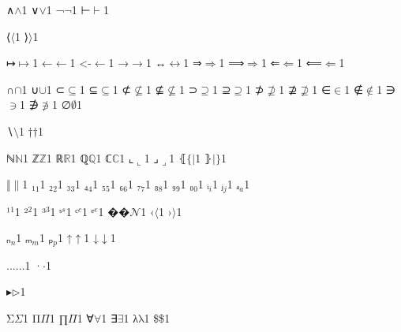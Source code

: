 {{∧}{{\ensuremath{\wedge}}}1
{∨}{{\ensuremath{\vee}}}1
{¬}{{\ensuremath{\neg}}}1
{⊢}{{\ensuremath{\vdash}}}1

{⟨}{{\ensuremath{\langle}}}1
{⟩}{{\ensuremath{\rangle}}}1

{↦}{{\ensuremath{\mapsto}}}1
{←}{{\ensuremath{\leftarrow}}}1
{<-}{{\ensuremath{\leftarrow}}}1
{→}{{\ensuremath{\rightarrow}}}1
{↔}{{\ensuremath{\leftrightarrow}}}1
{⇒}{{\ensuremath{\Rightarrow}}}1
{⟹}{{\ensuremath{\Longrightarrow}}}1
{⇐}{{\ensuremath{\Leftarrow}}}1
{⟸}{{\ensuremath{\Longleftarrow}}}1

{∩}{{\ensuremath{\cap}}}1
{∪}{{\ensuremath{\cup}}}1
{⊂}{{\ensuremath{\subseteq}}}1
{⊆}{{\ensuremath{\subseteq}}}1
{⊄}{{\ensuremath{\nsubseteq}}}1
{⊈}{{\ensuremath{\nsubseteq}}}1
{⊃}{{\ensuremath{\supseteq}}}1
{⊇}{{\ensuremath{\supseteq}}}1
{⊅}{{\ensuremath{\nsupseteq}}}1
{⊉}{{\ensuremath{\nsupseteq}}}1
{∈}{{\ensuremath{\in}}}1
{∉}{{\ensuremath{\notin}}}1
{∋}{{\ensuremath{\ni}}}1
{∌}{{\ensuremath{\notni}}}1
{∅}{{\ensuremath{\emptyset}}}1

{∖}{{\ensuremath{\setminus}}}1
{†}{{\ensuremath{\dag}}}1

{ℕ}{{\ensuremath{\mathbb{N}}}}1
{ℤ}{{\ensuremath{\mathbb{Z}}}}1
{ℝ}{{\ensuremath{\mathbb{R}}}}1
{ℚ}{{\ensuremath{\mathbb{Q}}}}1
{ℂ}{{\ensuremath{\mathbb{C}}}}1
{⌞}{{\ensuremath{\llcorner}}}1
{⌟}{{\ensuremath{\lrcorner}}}1
{⦃}{{\ensuremath{\{\!|}}}1
{⦄}{{\ensuremath{|\!\}}}}1

{‖}{{\ensuremath{\|}}}1
{₁}{{\ensuremath{_1}}}1
{₂}{{\ensuremath{_2}}}1
{₃}{{\ensuremath{_3}}}1
{₄}{{\ensuremath{_4}}}1
{₅}{{\ensuremath{_5}}}1
{₆}{{\ensuremath{_6}}}1
{₇}{{\ensuremath{_7}}}1
{₈}{{\ensuremath{_8}}}1
{₉}{{\ensuremath{_9}}}1
{₀}{{\ensuremath{_0}}}1
{ᵢ}{{\ensuremath{_i}}}1
{ⱼ}{{\ensuremath{_j}}}1
{ₐ}{{\ensuremath{_a}}}1

{¹}{{\ensuremath{^1}}}1
{²}{{\ensuremath{^2}}}1
{³}{{\ensuremath{^3}}}1
{ˢ}{{\ensuremath{^s}}}1
{ᶜ}{{\ensuremath{^c}}}1
{ᵉ}{{\ensuremath{^e}}}1
{��}{{\ensuremath{\mathcal{N}}}}1
{‹}{{\ensuremath{\langle}}}1
{›}{{\ensuremath{\rangle}}}1

{ₙ}{{\ensuremath{_n}}}1
{ₘ}{{\ensuremath{_m}}}1
{ₚ}{{\ensuremath{_p}}}1
{↑}{{\ensuremath{\uparrow}}}1
{↓}{{\ensuremath{\downarrow}}}1

{...}{{\ensuremath{\ldots}}}1
{·}{{\ensuremath{\cdot}}}1

{▸}{{\ensuremath{\triangleright}}}1

{Σ}{{\color{symbolcolor}\ensuremath{\Sigma}}}1
{Π}{{\color{symbolcolor}\ensuremath{\Pi}}}1
{∏}{{\color{symbolcolor}\ensuremath{\Pi}}}1
{∀}{{\color{symbolcolor}\ensuremath{\forall}}}1
{∃}{{\color{symbolcolor}\ensuremath{\exists}}}1
{λ}{{\color{symbolcolor}\ensuremath{\mathrm{\lambda}}}}1
{\$}{{\color{symbolcolor}\$}}1

}
